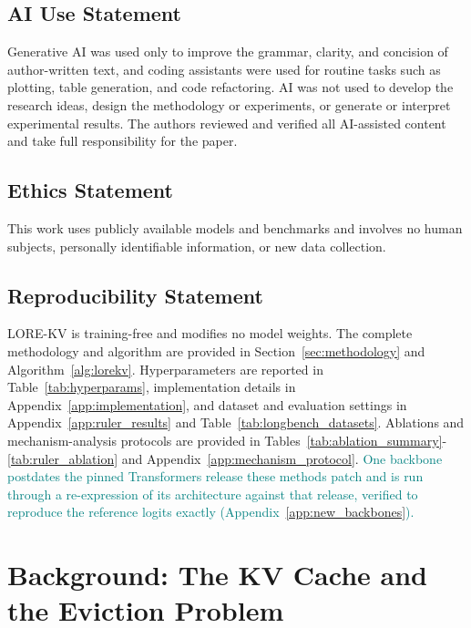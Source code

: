 \documentclass{article} %
\begin{document}
\subsection*{AI Use Statement}

Generative AI was used only to improve the grammar, clarity, and concision of author-written text, and coding assistants were used for routine tasks such as plotting, table generation, and code refactoring. AI was not used to develop the research ideas, design the methodology or experiments, or generate or interpret experimental results. The authors reviewed and verified all AI-assisted content and take full responsibility for the paper.

\subsection*{Ethics Statement}

This work uses publicly available models and benchmarks and involves no human subjects, personally identifiable information, or new data collection.

\subsection*{Reproducibility Statement}

LORE-KV is training-free and modifies no model weights. The complete methodology and algorithm are provided in Section~\ref{sec:methodology} and Algorithm~\ref{alg:lorekv}. Hyperparameters are reported in Table~\ref{tab:hyperparams}, implementation details in Appendix~\ref{app:implementation}, and dataset and evaluation settings in Appendix~\ref{app:ruler_results} and Table~\ref{tab:longbench_datasets}. Ablations and mechanism-analysis protocols are provided in Tables~\ref{tab:ablation_summary}-\ref{tab:ruler_ablation} and Appendix~\ref{app:mechanism_protocol}. \textcolor{teal}{One backbone postdates the pinned Transformers release these methods patch and is run through a re-expression of its architecture against that release, verified to reproduce the reference logits exactly (Appendix~\ref{app:new_backbones}).}




\appendix

\section{Background: The KV Cache and the Eviction Problem} \label{app:kv_background}
\end{document}
